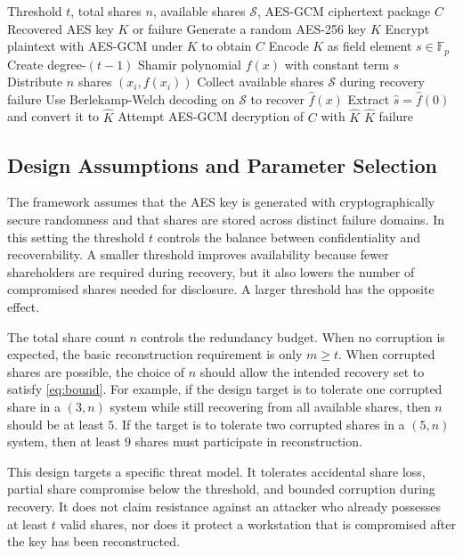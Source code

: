 \begin{algorithm}[!t]
\caption{Robust AES Key Recovery}
\label{alg:recovery}
\begin{algorithmic}[1]
\Require Threshold $t$, total shares $n$, available shares $\mathcal{S}$, AES-GCM ciphertext package $C$
\Ensure Recovered AES key $K$ or failure
\State Generate a random AES-256 key $K$
\State Encrypt plaintext with AES-GCM under $K$ to obtain $C$
\State Encode $K$ as field element $s \in \mathbb{F}_{p}$
\State Create degree-$(t-1)$ Shamir polynomial $f(x)$ with constant term $s$
\State Distribute $n$ shares $(x_{i}, f(x_{i}))$
\State Collect available shares $\mathcal{S}$ during recovery
    \State \Return failure
\EndIf
\State Use Berlekamp-Welch decoding on $\mathcal{S}$ to recover $\hat{f}(x)$
\State Extract $\hat{s} = \hat{f}(0)$ and convert it to $\hat{K}$
\State Attempt AES-GCM decryption of $C$ with $\hat{K}$
    \State \Return $\hat{K}$
\Else
    \State \Return failure
\EndIf
\end{algorithmic}
\end{algorithm}

\subsection{Design Assumptions and Parameter Selection}

The framework assumes that the AES key is generated with cryptographically secure randomness and that shares are stored across distinct failure domains. In this setting the threshold $t$ controls the balance between confidentiality and recoverability. A smaller threshold improves availability because fewer shareholders are required during recovery, but it also lowers the number of compromised shares needed for disclosure. A larger threshold has the opposite effect.

The total share count $n$ controls the redundancy budget. When no corruption is expected, the basic reconstruction requirement is only $m \geq t$. When corrupted shares are possible, the choice of $n$ should allow the intended recovery set to satisfy \eqref{eq:bound}. For example, if the design target is to tolerate one corrupted share in a $(3,n)$ system while still recovering from all available shares, then $n$ should be at least $5$. If the target is to tolerate two corrupted shares in a $(5,n)$ system, then at least $9$ shares must participate in reconstruction.

This design targets a specific threat model. It tolerates accidental share loss, partial share compromise below the threshold, and bounded corruption during recovery. It does not claim resistance against an attacker who already possesses at least $t$ valid shares, nor does it protect a workstation that is compromised after the key has been reconstructed.
